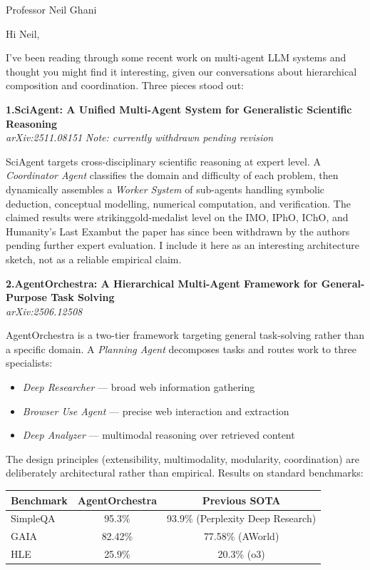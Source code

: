 \documentclass[12pt,a4paper]{letter}
\date{13 May 2026}
\begin{document}
\begin{letter}{Professor Neil Ghani}

\opening{Hi Neil,}

I've been reading through some recent work on multi-agent LLM systems and thought you might find it interesting, given our conversations about hierarchical composition and coordination. Three pieces stood out:

\bigskip
\noindent\textbf{1.\quad SciAgent: A Unified Multi-Agent System for Generalistic Scientific Reasoning}\\
\textit{arXiv:2511.08151} \quad\textemdash\quad \textit{Note: currently withdrawn pending revision}

\smallskip
SciAgent targets cross-disciplinary scientific reasoning at expert level. A \emph{Coordinator Agent} classifies the domain and difficulty of each problem, then dynamically assembles a \emph{Worker System} of sub-agents handling symbolic deduction, conceptual modelling, numerical computation, and verification. The claimed results were striking\textemdash gold-medalist level on the IMO, IPhO, IChO, and Humanity's Last Exam\textemdash but the paper has since been withdrawn by the authors pending further expert evaluation. I include it here as an interesting architecture sketch, not as a reliable empirical claim.

\bigskip
\noindent\textbf{2.\quad AgentOrchestra: A Hierarchical Multi-Agent Framework for General-Purpose Task Solving}\\
\textit{arXiv:2506.12508}

\smallskip
AgentOrchestra is a two-tier framework targeting general task-solving rather than a specific domain. A \emph{Planning Agent} decomposes tasks and routes work to three specialists:
\begin{itemize}
  \item \emph{Deep Researcher} --- broad web information gathering
  \item \emph{Browser Use Agent} --- precise web interaction and extraction
  \item \emph{Deep Analyzer} --- multimodal reasoning over retrieved content
\end{itemize}

The design principles (extensibility, multimodality, modularity, coordination) are deliberately architectural rather than empirical. Results on standard benchmarks:

\medskip
\begin{center}
\begin{tabular}{lcc}
\toprule
\textbf{Benchmark} & \textbf{AgentOrchestra} & \textbf{Previous SOTA} \\
\midrule
SimpleQA  & 95.3\%  & 93.9\% (Perplexity Deep Research) \\
GAIA      & 82.42\% & 77.58\% (AWorld) \\
HLE       & 25.9\%  & 20.3\% (o3) \\
\bottomrule
\end{tabular}
\end{center}


\end{letter}
\end{document}

